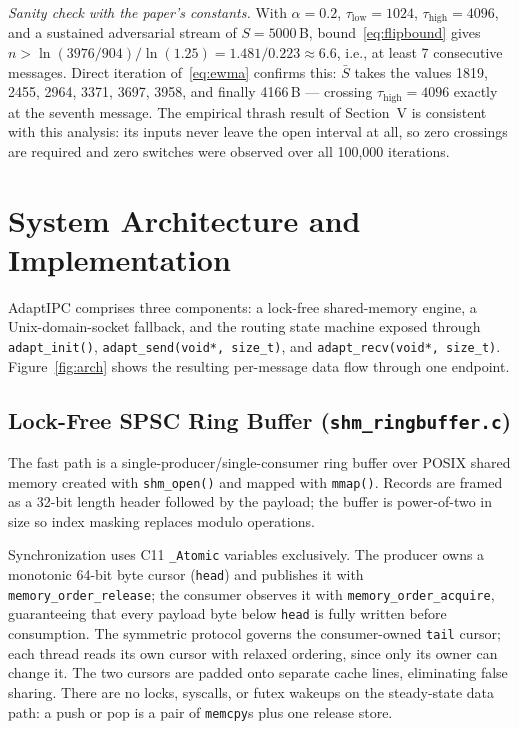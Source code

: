 \documentclass[conference]{IEEEtran}
\newcommand{\taulow}{\tau_{\mathrm{low}}}
\newcommand{\tauhigh}{\tau_{\mathrm{high}}}
\newcommand{\sbar}{\bar{S}}
\begin{document}
\emph{Sanity check with the paper's constants.} With $\alpha = 0.2$,
$\taulow = 1024$, $\tauhigh = 4096$, and a sustained adversarial stream of
$S = 5000$\,B, bound~\eqref{eq:flipbound} gives
$n > \ln(3976/904)/\ln(1.25) = 1.481/0.223 \approx 6.6$, i.e., at least
7 consecutive messages. Direct iteration of~\eqref{eq:ewma} confirms this:
$\sbar$ takes the values 1819, 2455, 2964, 3371, 3697, 3958, and finally
4166\,B --- crossing $\tauhigh = 4096$ exactly at the seventh message. The
empirical thrash result of Section~V is consistent with this analysis: its
inputs never leave the open interval at all, so zero crossings are required
and zero switches were observed over all 100{,}000 iterations.


\section{System Architecture and Implementation}
AdaptIPC comprises three components: a lock-free shared-memory engine, a
Unix-domain-socket fallback, and the routing state machine exposed through
\texttt{adapt\_init()}, \texttt{adapt\_send(void*, size\_t)}, and
\texttt{adapt\_recv(void*, size\_t)}. Figure~\ref{fig:arch} shows the
resulting per-message data flow through one endpoint.


\subsection{Lock-Free SPSC Ring Buffer (\texttt{shm\_ringbuffer.c})}
The fast path is a single-producer/single-consumer ring buffer over POSIX
shared memory created with \texttt{shm\_open()} and mapped with
\texttt{mmap()}. Records are framed as a 32-bit length header followed by the
payload; the buffer is power-of-two in size so index masking replaces modulo
operations.

Synchronization uses C11 \texttt{\_Atomic} variables exclusively. The
producer owns a monotonic 64-bit byte cursor (\texttt{head}) and publishes it
with \texttt{memory\_order\_release}; the consumer observes it with
\texttt{memory\_order\_acquire}, guaranteeing that every payload byte below
\texttt{head} is fully written before consumption. The symmetric protocol
governs the consumer-owned \texttt{tail} cursor; each thread reads its own
cursor with relaxed ordering, since only its owner can change it. The two
cursors are padded onto separate cache lines, eliminating false sharing.
There are no locks, syscalls, or futex wakeups on the steady-state data path:
a push or pop is a pair of \texttt{memcpy}s plus one release store.
\end{document}
